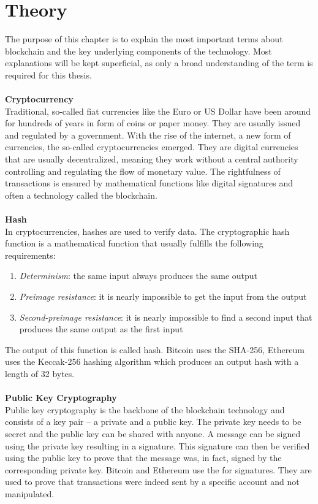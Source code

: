 \section{Theory}
The purpose of this chapter is to explain the most important terms about blockchain and the key underlying components of the technology.
Most explanations will be kept superficial, as only a broad understanding of the term is required for this thesis.
\\\\

\textbf{Cryptocurrency}\\
Traditional, so-called fiat currencies like the Euro or US Dollar have been around for hundreds of years in form of coins or paper money.
They are usually issued and regulated by a government.
With the rise of the internet, a new form of currencies, the so-called cryptocurrencies emerged.
They are digital currencies that are usually decentralized, meaning they work without a central authority controlling and regulating the flow of monetary value.
The rightfulness of transactions is ensured by mathematical functions like digital signatures and often a technology called the blockchain.
\\\\

\textbf{Hash}\\
In cryptocurrencies, hashes are used to verify data.
The cryptographic hash function is a mathematical function that usually fulfills the following requirements\cite{hash}:
\begin{enumerate}
    \item \textit{Determinism}: the same input always produces the same output
    \item \textit{Preimage resistance}: it is nearly impossible to get the input from the output
    \item \textit{Second-preimage resistance}: it is nearly impossible to find a second input that produces the same output as the first input
\end{enumerate}
The output of this function is called hash.
Bitcoin uses the SHA-256\cite{bitcoin-whitepaper}, Ethereum uses the Keccak-256\cite{ethereum-yellow-paper} hashing algorithm which produces an output hash with a length of 32 bytes.
\\\\

\textbf{Public Key Cryptography}\\
Public key cryptography\cite{public-key-cryptography} is the backbone of the blockchain technology and consists of a key pair – a private and a public key.
The private key needs to be secret and the public key can be shared with anyone.
A message can be signed using the private key resulting in a signature.
This signature can then be verified using the public key to prove that the message was, in fact, signed by the corresponding private key.
Bitcoin and Ethereum use the  for signatures.
They are used to prove that transactions were indeed sent by a specific account and not manipulated.
\newpage

